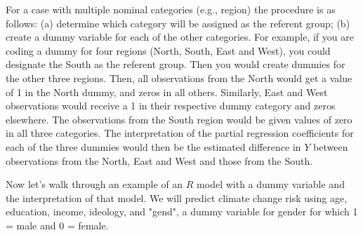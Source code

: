 \documentclass[11pt,openany]{book}\usepackage[]{graphicx}\usepackage[]{color}
\begin{document}
For a case with multiple nominal categories (e.g., region) the procedure is as follows: (a) determine which category will be assigned as the referent group; (b) create a dummy variable for each of the other categories. For example, if you are coding a dummy for four regions (North, South, East and West), you could designate the South as the referent group. Then you would create dummies for the other three regions. Then, all observations from
the North would get a value of 1 in the North dummy, and zeros in all others. Similarly, East and West observations would receive a 1 in their respective dummy category and zeros elsewhere. The observations from the South region would be given values of zero in all three categories. The interpretation of the partial regression coefficients for each of the three dummies would then be the estimated difference in $Y$ between observations from the North, East and West and those from the South.

Now let's walk through an example of an $R$ model with a dummy variable and the interpretation of that model. We will predict climate change risk using age, education, income, ideology, and "gend", a dummy variable for gender for which 1 = male and 0 = female. 
\end{document}

